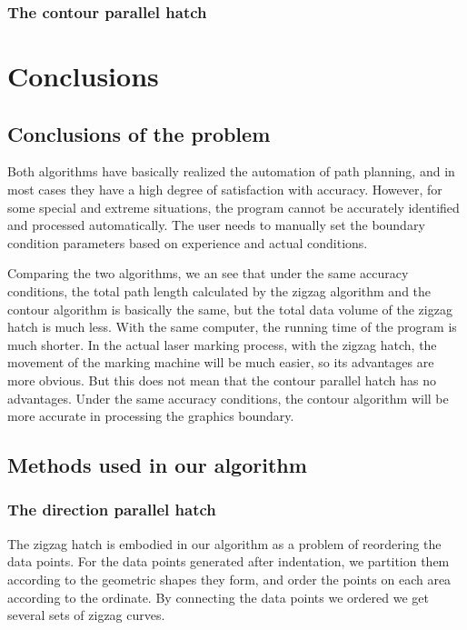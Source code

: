 \documentclass{apmcmthesis}
\begin{document}
\subsubsection{The contour parallel hatch}

\section{Conclusions}

\subsection{Conclusions of the problem}

Both algorithms have basically realized the automation of path planning, and in most cases they have a high degree of satisfaction with accuracy. However, for some special and extreme situations, the program cannot be accurately identified and processed automatically. The user needs to manually set the boundary condition parameters based on experience and actual conditions.


Comparing the two algorithms, we an see that under the same accuracy conditions, the total path length calculated by the zigzag algorithm and the contour algorithm is basically the same, but the total data volume of the zigzag hatch is much less. With the same computer, the running time of the program is much shorter. In the actual laser marking process, with the zigzag hatch, the movement of the marking machine will be much easier, so its advantages are more obvious. But this does not mean that the contour parallel hatch has no advantages. Under the same accuracy conditions, the contour algorithm will be more accurate in processing the graphics boundary.


\subsection{Methods used in our algorithm}

\subsubsection{The direction parallel hatch}

The zigzag hatch is embodied in our algorithm as a problem of reordering the data points. For the data points generated after indentation, we partition them according to the geometric shapes they form, and order the points on each area according to the ordinate. By connecting the data points we ordered we get several sets of zigzag curves.
\end{document}
